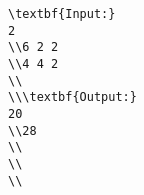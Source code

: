 \begin{verbatim}
\textbf{Input:}
2
\\6 2 2
\\4 4 2
\\
\\\textbf{Output:}
20
\\28 
\\
\\
\\\end{verbatim}